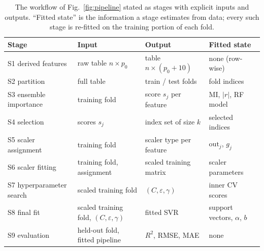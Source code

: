 \begin{table}[htbp]
\centering
\caption{The workflow of Fig.~\ref{fig:pipeline} stated as stages with explicit inputs and outputs. ``Fitted state'' is the information a stage estimates from data; every such stage is re-fitted on the training portion of each fold.}\label{tab:workflow}
\small
\begin{tabular}{llll}
\toprule
Stage & Input & Output & Fitted state \\
\midrule
S1 derived features & raw table $n \times p_0$ & table $n \times (p_0{+}10)$ & none (row-wise) \\
S2 partition & full table & train / test folds & fold indices \\
S3 ensemble importance & training fold & score $s_j$ per feature & MI, $|r|$, RF model \\
S4 selection & scores $s_j$ & index set of size $k$ & selected indices \\
S5 scaler assignment & training fold & scaler type per feature & $\mathrm{out}_j$, $g_j$ \\
S6 scaler fitting & training fold, assignment & scaled training matrix & scaler parameters \\
S7 hyperparameter search & scaled training fold & $(C, \varepsilon, \gamma)$ & inner CV scores \\
S8 final fit & scaled training fold, $(C,\varepsilon,\gamma)$ & fitted SVR & support vectors, $\alpha$, $b$ \\
S9 evaluation & held-out fold, fitted pipeline & $R^2$, RMSE, MAE & none \\
\bottomrule
\end{tabular}
\end{table}
